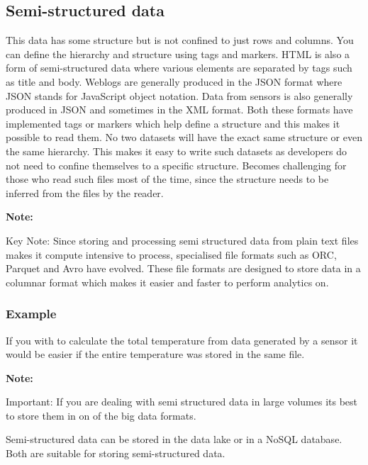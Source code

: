 \documentclass[a4paper, 11pt]{book}
\newenvironment{note}{
    \begin{siderule}
        \textbf{Note: }
        }{
    \end{siderule}}
\begin{document}
    \subsection{Semi-structured data}
    This data has some structure but is not confined to just rows and columns.
    You can define the hierarchy and structure using tags and markers.
    HTML is also a form of semi-structured data where various elements are separated by tags such as title and body.
    Weblogs are generally produced in the JSON format where JSON stands for JavaScript object notation.
    Data from sensors is also generally produced in JSON and sometimes in the XML format.
    Both these formats have implemented tags or markers which help define a structure and this makes it possible to read them.
    No two datasets will have the exact same structure or even the same hierarchy.
    This makes it easy to write such datasets as developers do not need to confine themselves to a specific structure.
    Becomes challenging for those who read such files most of the time, since the structure needs to be inferred from the files by the reader.

    \begin{note}
        Key Note: Since storing and processing semi structured data from plain text files makes it compute intensive to process, specialised file formats such as ORC, Parquet and Avro have evolved.
        These file formats are designed to store data in a columnar format which makes it easier and faster to perform analytics on.
    \end{note}

    \subsubsection{Example}
    If you with to calculate the total temperature from data generated by a sensor it would be easier if the entire temperature was stored in the same file.

    \begin{note}
        Important: If you are dealing with semi structured data in large volumes its best to store them in on of the big data formats.
    \end{note}

    Semi-structured data can be stored in the data lake or in a NoSQL database.
    Both are suitable for storing semi-structured data.
\end{document}

